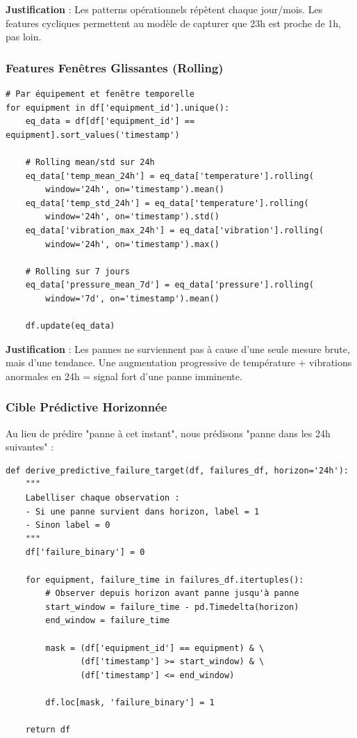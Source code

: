 \documentclass[12pt,a4paper,french]{article}
\begin{document}
\textbf{Justification} : Les patterns opérationnels répètent chaque jour/mois. Les features cycliques permettent au modèle de capturer que 23h est proche de 1h, pas loin.

\subsubsection{Features Fenêtres Glissantes (Rolling)}

\begin{lstlisting}
# Par équipement et fenêtre temporelle
for equipment in df['equipment_id'].unique():
    eq_data = df[df['equipment_id'] == equipment].sort_values('timestamp')
    
    # Rolling mean/std sur 24h
    eq_data['temp_mean_24h'] = eq_data['temperature'].rolling(
        window='24h', on='timestamp').mean()
    eq_data['temp_std_24h'] = eq_data['temperature'].rolling(
        window='24h', on='timestamp').std()
    eq_data['vibration_max_24h'] = eq_data['vibration'].rolling(
        window='24h', on='timestamp').max()
    
    # Rolling sur 7 jours
    eq_data['pressure_mean_7d'] = eq_data['pressure'].rolling(
        window='7d', on='timestamp').mean()
    
    df.update(eq_data)
\end{lstlisting}

\textbf{Justification} : Les pannes ne surviennent pas à cause d'une seule mesure brute, mais d'une tendance. Une augmentation progressive de température + vibrations anormales en 24h = signal fort d'une panne imminente.

\subsubsection{Cible Prédictive Horizonnée}

Au lieu de prédire "panne à cet instant", nous prédisons "panne dans les 24h suivantes" :

\begin{lstlisting}
def derive_predictive_failure_target(df, failures_df, horizon='24h'):
    """
    Labelliser chaque observation :
    - Si une panne survient dans horizon, label = 1
    - Sinon label = 0
    """
    df['failure_binary'] = 0
    
    for equipment, failure_time in failures_df.itertuples():
        # Observer depuis horizon avant panne jusqu'à panne
        start_window = failure_time - pd.Timedelta(horizon)
        end_window = failure_time
        
        mask = (df['equipment_id'] == equipment) & \
               (df['timestamp'] >= start_window) & \
               (df['timestamp'] <= end_window)
        
        df.loc[mask, 'failure_binary'] = 1
    
    return df
\end{lstlisting}
\end{document}
